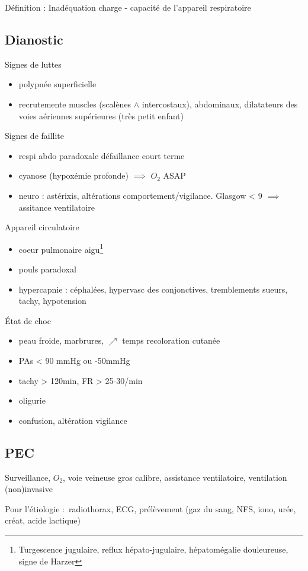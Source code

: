 Définition : Inadéquation charge - capacité de l'appareil respiratoire

\subsection{Dianostic}
Signes de luttes
\begin{itemize}
\item polypnée superficielle
\item recrutemente muscles (scalènes $\wedge$ intercostaux), abdominaux,
  dilatateurs des voies aériennes supérieures (très petit enfant)
\end{itemize}
Signes de faillite
\begin{itemize}
\item respi abdo paradoxale \skull{} défaillance court terme
\item cyanose (hypoxémie profonde) $\implies$ $O_2$ ASAP
\item neuro : astérixis, altérations comportement/vigilance. Glasgow < 9
  $\implies$ assitance ventilatoire
\end{itemize}
Appareil circulatoire
\begin{itemize}
\item coeur pulmonaire aigu\footnote{Turgescence jugulaire, reflux
    hépato-jugulaire, hépatomégalie douleureuse, signe de Harzer}
\item pouls paradoxal
\item hypercapnie : {céphalées, hypervasc des conjonctives}, {tremblements
    sueurs, tachy, hypotension}
\end{itemize}
État de choc 
\begin{itemize}
\item peau froide, marbrures, $\nearrow$ temps recoloration cutanée
\item PAs < 90 mmHg ou -50mmHg
\item tachy > 120min, FR > 25-30/min
\item oligurie
\item confusion, altération vigilance
\end{itemize}

\subsection{PEC}
Surveillance, $O_2$, voie veineuse gros calibre, assistance ventilatoire,
ventilation (non)invasive

Pour l'étiologie : radiothorax, ECG, prélèvement (gaz du sang, NFS, iono, urée,
créat, acide lactique)


